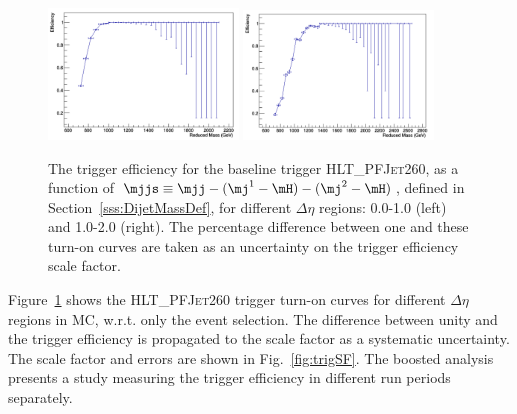 \begin{figure}[h]
  \begin{center}  
    \includegraphics[width=0.45\textwidth]{F5/QCDDeta0v2.pdf} 
    \includegraphics[width=0.45\textwidth]{F5/QCDDeta1v2.pdf} 
  \end{center}
  \caption{The trigger efficiency for the baseline trigger \textsc{HLT\_PFJet260}, as a function of $\mjjs \equiv \mjj - (\mj^{1}-\mH) - (\mj^{2}-\mH)$, defined in Section~\ref{sss:DijetMassDef}, for different $\Delta\eta$ regions: 0.0-1.0 (left) and 1.0-2.0 (right).%
The percentage difference between one and these turn-on curves are taken as an uncertainty on the trigger efficiency scale factor.}
  \label{fig:trigeEffvsMjj_QCDHT_HLTPFJet260_DEtabins}
\end{figure}

Figure~\ref{fig:trigeEffvsMjj_QCDHT_HLTPFJet260_DEtabins} shows the \textsc{HLT\_PFJet260} trigger turn-on curves for different $\Delta\eta$ regions in MC, %
w.r.t. only the event selection. The difference between unity and the trigger efficiency is propagated to the scale factor as a systematic uncertainty. 
The scale factor and errors are shown in Fig.~\ref{fig:trigSF}. %
The boosted analysis~\cite{CMS-PAS-B2G-16-026} presents a study measuring the trigger efficiency in different run periods separately.


